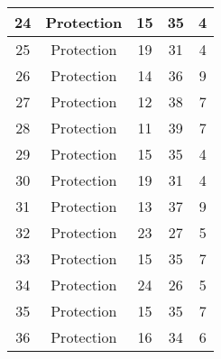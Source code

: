 \documentclass[results.tex]{subfiles}
\begin{document}
\begin{center}
\begin{tabular}{| c || c | c | c | c |}
            \hline
            24                      & Protection                   & 15                     & 35                      & 4                    \\
            \hline
            25                      & Protection                   & 19                     & 31                      & 4                    \\
            \hline
            26                      & Protection                   & 14                     & 36                      & 9                    \\
            \hline
            27                      & Protection                   & 12                     & 38                      & 7                    \\
            \hline
            28                      & Protection                   & 11                     & 39                      & 7                    \\
            \hline
            29                      & Protection                   & 15                     & 35                      & 4                    \\
            \hline
            30                      & Protection                   & 19                     & 31                      & 4                    \\
            \hline
            31                      & Protection                   & 13                     & 37                      & 9                    \\
            \hline
            32                      & Protection                   & 23                     & 27                      & 5                    \\
            \hline
            33                      & Protection                   & 15                     & 35                      & 7                    \\
            \hline
            34                      & Protection                   & 24                     & 26                      & 5                    \\
            \hline
            35                      & Protection                   & 15                     & 35                      & 7                    \\
            \hline
            36                      & Protection                   & 16                     & 34                      & 6                    \\

\end{tabular}
\end{center}
\end{document}
